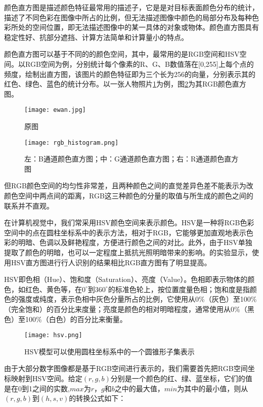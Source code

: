   颜色直方图是描述颜色特征最常用的描述子，它是是对目标表面颜色分布的统计，描述了不同色彩在图像中所占的比例，但无法描述图像中颜色的局部分布及每种色彩所处的空间位置，即无法描述图像中的某一具体的对象或物体。颜色直方图具有稳定性好、抗部分遮挡、计算方法简单和计算量小的特点。

  颜色直方图可以基于不同的的颜色空间，其中，最常用的是RGB空间和HSV空间。以RGB空间为例，分别统计每个像素的R、G、B数值落在[0,255]上每个点的频度，绘制出直方图，该图片的颜色特征即为三个长为256的向量，分别表示其的红色、绿色、蓝色的统计分布。以一张人物照片\ref{fig:ewan}为例，图\ref{fig:rgbhistogram}为其RGB颜色直方图。

\begin{figure}[htb]
  \centering
  \texttt{[image: ewan.jpg]}
  \caption{原图}
  \label{fig:ewan}
\end{figure}

\begin{figure}[htb]
  \centering
  \texttt{[image: rgb\_histogram.png]}
  \caption{左：B通道颜色直方图；中：G通道颜色直方图；右：R通道颜色直方图}
  \label{fig:rgbhistogram}
\end{figure}

  但RGB颜色空间的均匀性非常差，且两种颜色之间的直觉差异色差不能表示为改颜色空间中两点间的距离，RGB这三种颜色的分量的取值与所生成的颜色之间的联系并不直观。

  在计算机视觉中，我们常采用HSV颜色空间来表示颜色。HSV是一种将RGB色彩空间中的点在圆柱坐标系中的表示方法，相对于RGB，它能够更加直观地表示色彩的明暗、色调以及鲜艳程度，方便进行颜色之间的对比。此外，由于HSV单独提取了颜色的明暗，也可以一定程度上抵抗光照明暗带来的影响。\citet{sural2002segmentation}的实验显示，使用HSV直方图进行行人识别的结果相比RGB直方图有了明显提高。

  HSV即色相（Hue）、饱和度（Saturation）、亮度（Value）。色相即表示物体的颜色，如红色、黄色等，在$0^{\circ}$到$360^{\circ}$的标准色轮上，按位置度量色相；饱和度是指颜色的强度或纯度，表示色相中灰色分量所占的比例，它使用从0\%（灰色）至100\%（完全饱和）的百分比来度量；亮度是颜色的相对明暗程度，通常使用从0\%（黑色）至100\%（白色）的百分比来衡量。

\begin{figure}[htb]
  \centering
  \texttt{[image: hsv.png]}
  \caption{HSV模型可以使用圆柱坐标系中的一个圆锥形子集表示}
  \label{fig:hsv}
\end{figure}

  由于大部分数字图像都是基于RGB空间进行表示的，我们需要首先把RGB空间坐标映射到HSV空间。给定$(r,g,b)$分别是一个颜色的红、绿、蓝坐标，它们的值是在0到1之间的实数,$max$为$r$，$g$和$b$之中的最大值，$min$为其中的最小值，则从$(r,g,b)$到$(h,s,v)$的转换公式如下：\cite{foley1982fundamentals}

